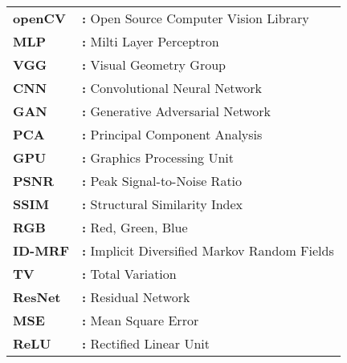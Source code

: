 \hspace{-3mm}

\begin{tabular}{ p{2cm} l }
    {\bf{openCV}} & {\bf:} Open Source Computer Vision Library\\
    {\bf{MLP}} & {\bf:} Milti Layer Perceptron\\
    {\bf{VGG}} & {\bf:} Visual Geometry Group\\
    {\bf{CNN}} & {\bf:} Convolutional Neural Network\\
    {\bf{GAN}} & {\bf:} Generative Adversarial Network\\
    {\bf{PCA}} & {\bf:} Principal Component Analysis\\
    {\bf{GPU}} & {\bf:} Graphics Processing Unit\\
    {\bf{PSNR}} & {\bf:} Peak Signal-to-Noise Ratio\\
    {\bf{SSIM}} & {\bf:} Structural Similarity Index\\
    {\bf{RGB}} & {\bf:} Red, Green, Blue\\
    {\bf{ID-MRF}} & {\bf:} Implicit Diversified Markov Random Fields\\
    {\bf{TV}} & {\bf:} Total Variation\\
    {\bf{ResNet}} & {\bf:} Residual Network\\
    {\bf{MSE}} & {\bf:} Mean Square Error\\
    {\bf{ReLU}} & {\bf:} Rectified Linear Unit\\
\end{tabular}

